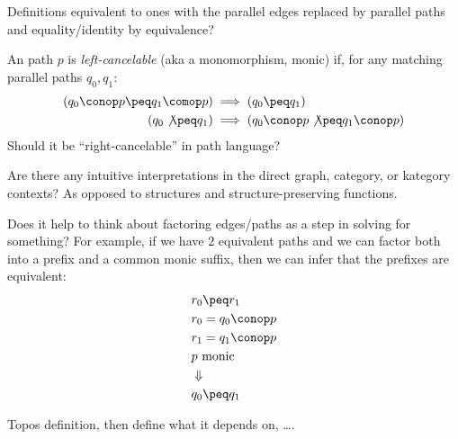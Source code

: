 \documentclass[11pt]{book}
\begin{document}

Definitions equivalent to ones with the parallel
edges replaced by parallel paths and equality/identity 
by equivalence? 

An path $p$ is \textit{left-cancelable} (aka a monomorphism, monic)
if, for any matching parallel paths $q_0,q_1$:
\begin{align*}
\left( q_0 \conop p \peq q_1 \comop p \right) 
& 
\implies 
\left( q_0 \peq q_1 \right) 
\\
\left( q_0 \not\peq q_1 \right) 
& \implies 
\left( q_0 \conop p \not\peq q_1 \conop p \right) 
\end{align*}
Should it be ``right-cancelable'' in path language?


Are there any intuitive interpretations in the direct graph,
category, or kategory contexts? As opposed to 
structures and structure-preserving functions.

Does it help to think about factoring edges/paths
as a step in solving for something?
For example, if we have $2$ equivalent paths 
and we can factor both into a prefix and a common monic
suffix, then we can infer that the prefixes are equivalent:
\begin{align*}
& r_0 \peq r_1 \\
& r_0 = q_0 \conop p \\
& r_1 = q_1 \conop p \\
& p \text{ monic } \\
& \Downarrow \\
& q_0 \peq q_1
\end{align*}

\setcounter{currentlevel}{\value{baseSectionLevel}}
\label{sec:Topos-down}
 
Topos definition, then define what it depends on, \ldots.
 
\setcounter{currentlevel}{\value{baseSectionLevel}}
\label{sec:Fusion}
\end{document}
